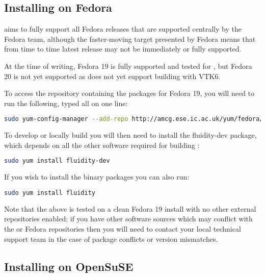 \subsection{Installing on Fedora}
\label{sec:required_ḻibraries_fedora}

\fluidity aims to fully support all Fedora releases that are supported
centrally by the Fedora team, although the faster-moving target presented by
Fedora means that from time to time latest release may not be immediately or
fully supported.

At the time of writing, Fedora 19 is fully supported and tested for \fluidity,
but Fedora 20 is not yet supported as \fluidity does not yet support building
with VTK6.

To access the repository containing the \fluidity packages for Fedora 19, you
will need to run the following, typed all on one line:

\begin{lstlisting}[language=bash]
sudo yum-config-manager --add-repo http://amcg.ese.ic.ac.uk/yum/fedora/19/fluidity.repo
\end{lstlisting}

To develop or locally build \fluidity you will then need to install the
fluidity-dev package, which depends on all the other software required for
building \fluidity:

\begin{lstlisting}[language=bash]
sudo yum install fluidity-dev
\end{lstlisting}

If you wish to install the \fluidity binary packages you can also run:

\begin{lstlisting}[language=bash]
sudo yum install fluidity
\end{lstlisting}

Note that the above is tested on a clean Fedora 19 install with no other
external repositories enabled; if you have other software sources which may
conflict with the \fluidity or Fedora repositories then you will need to
contact your local technical support team in the case of package conflicts or
version mismatches.

\subsection{Installing on OpenSuSE}
\label{sec:required_ḻibraries_opensuse}

